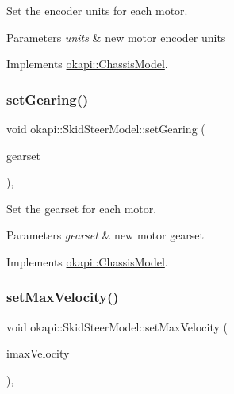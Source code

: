 Set the encoder units for each motor.


\begin{DoxyParams}{Parameters}
{\em units} & new motor encoder units \\
\hline
\end{DoxyParams}


Implements \mbox{\hyperlink{classokapi_1_1ChassisModel_ae8ba9a72bf827af4c6feffaac99b33ee}{okapi\+::\+Chassis\+Model}}.

\mbox{\label{classokapi_1_1SkidSteerModel_ad890989e345cfd7455436bc5dd6efdcc}} 
\subsubsection{\texorpdfstring{setGearing()}{setGearing()}}
{\footnotesize\ttfamily void okapi\+::\+Skid\+Steer\+Model\+::set\+Gearing (\begin{DoxyParamCaption}\item[{\mbox{\hyperlink{classokapi_1_1AbstractMotor_a88aaa6ea2fa10f5520a537bbf26774d5}{Abstract\+Motor\+::gearset}}}]{gearset }\end{DoxyParamCaption})\hspace{0.3cm}{\ttfamily [override]}, {\ttfamily [virtual]}}

Set the gearset for each motor.


\begin{DoxyParams}{Parameters}
{\em gearset} & new motor gearset \\
\hline
\end{DoxyParams}


Implements \mbox{\hyperlink{classokapi_1_1ChassisModel_a960d6ce2f21e5832fce1d7566408cb61}{okapi\+::\+Chassis\+Model}}.

\mbox{\label{classokapi_1_1SkidSteerModel_a4beda353f201fa72fc8d31f47a08d473}} 
\subsubsection{\texorpdfstring{setMaxVelocity()}{setMaxVelocity()}}
{\footnotesize\ttfamily void okapi\+::\+Skid\+Steer\+Model\+::set\+Max\+Velocity (\begin{DoxyParamCaption}\item[{double}]{imax\+Velocity }\end{DoxyParamCaption})\hspace{0.3cm}{\ttfamily [override]}, {\ttfamily [virtual]}}

